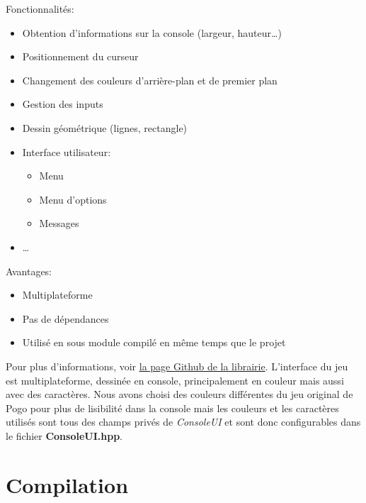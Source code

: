 \documentclass[article, backcover, french, nodocumentinfo]{upmethodology-document}
\begin{document}
					Fonctionnalités:
					\begin{itemize}
						\item Obtention d'informations sur la console (largeur, hauteur\ldots)
						\item Positionnement du curseur
						\item Changement des couleurs d'arrière-plan et de premier plan
						\item Gestion des inputs
						\item Dessin géométrique (lignes, rectangle)
						\item Interface utilisateur:
							\begin{itemize}
								\item Menu
								\item Menu d'options
								\item Messages
							\end{itemize}
						\item \ldots
					\end{itemize}
					Avantages:
					\begin{itemize}
						\item Multiplateforme
						\item Pas de dépendances
						\item Utilisé en sous module compilé en même temps que le projet
					\end{itemize}
					Pour plus d'informations, voir \href{https://github.com/pinam45/ConsoleControl}{la page Github de la librairie}.
					L'interface du jeu est multiplateforme, dessinée en console, principalement en couleur mais aussi avec des caractères. Nous avons choisi des couleurs différentes du jeu original de Pogo pour plus de lisibilité dans la console mais les couleurs et les caractères utilisés sont tous des champs privés de \textit{ConsoleUI} et sont donc configurables dans le fichier \textbf{ConsoleUI.hpp}.
	\section{Compilation}
\end{document}
